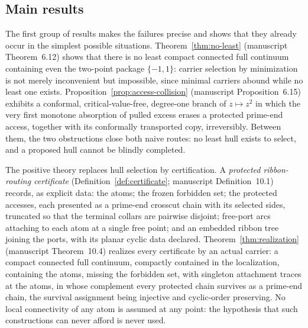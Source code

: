 \subsection{Main results}\label{subsec:A-results}

The first group of results makes the failures precise and shows that they
already occur in the simplest possible situations.
Theorem~\ref{thm:no-least} (manuscript Theorem~6.12) shows that there is no
least compact connected full continuum containing even the two-point package
$\{-1,1\}$: carrier selection by minimization is not merely inconvenient but
impossible, since minimal carriers abound while no least one exists.
Proposition~\ref{prop:access-collision} (manuscript Proposition~6.15)
exhibits a conformal, critical-value-free, degree-one branch of $z\mapsto
z^{2}$ in which the very first monotone absorption of pulled excess erases a
protected prime-end access, together with its conformally transported copy,
irreversibly.  Between them, the two obstructions close both naive routes: no
least hull exists to select, and a proposed hull cannot be blindly
completed.

The positive theory replaces hull selection by certification.  A
\emph{protected ribbon-routing certificate}
(Definition~\ref{def:certificate}; manuscript Definition~10.1) records, as
explicit data: the atoms; the frozen forbidden set; the protected accesses,
each presented as a prime-end crosscut chain with its selected sides,
truncated so that the terminal collars are pairwise disjoint; free-port arcs
attaching to each atom at a single free point; and an embedded ribbon
tree joining the ports, with its planar cyclic data declared.
Theorem~\ref{thm:realization} (manuscript Theorem~10.4) realizes every
certificate by an actual carrier: a compact connected full continuum,
compactly contained in the localization, containing the atoms, missing the
forbidden set, with singleton attachment traces at the atoms, in whose
complement every protected chain survives as a prime-end chain, the survival
assignment being injective and cyclic-order preserving.  No local
connectivity of any atom is assumed at any point: the hypothesis that such
constructions can never afford is never used.

